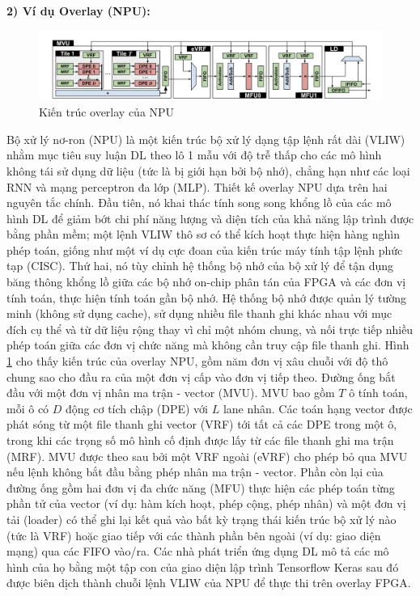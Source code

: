 \documentclass[a4paper]{article}
\begin{document}
\textbf{2) Ví dụ Overlay (NPU):}

\begin{figure} [!h]
    \centering
    \includegraphics[width=0.75\linewidth]{assets/fpga_6.png}
    \caption{Kiến trúc overlay của NPU}
    \label{fig:fpga_6}
\end{figure}

Bộ xử lý nơ-ron (NPU) là một kiến trúc bộ xử lý dạng tập lệnh rất dài (VLIW) nhằm mục tiêu suy luận DL theo lô 1 mẫu với độ trễ thấp cho các mô hình không tái sử dụng dữ liệu (tức là bị giới hạn bởi bộ nhớ), chẳng hạn như các loại RNN và mạng perceptron đa lớp (MLP). Thiết kế overlay NPU dựa trên hai nguyên tắc chính. Đầu tiên, nó khai thác tính song song khổng lồ của các mô hình DL để giảm bớt chi phí năng lượng và diện tích của khả năng lập trình được bằng phần mềm; một lệnh VLIW thô sơ có thể kích hoạt thực hiện hàng nghìn phép toán, giống như một ví dụ cực đoan của kiến trúc máy tính tập lệnh phức tạp (CISC). Thứ hai, nó tùy chỉnh hệ thống bộ nhớ của bộ xử lý để tận dụng băng thông khổng lồ giữa các bộ nhớ on-chip phân tán của FPGA và các đơn vị tính toán, thực hiện tính toán gần bộ nhớ. Hệ thống bộ nhớ được quản lý tường minh (không sử dụng cache), sử dụng nhiều file thanh ghi khác nhau với mục đích cụ thể và từ dữ liệu rộng thay vì chỉ một nhóm chung, và nối trực tiếp nhiều phép toán giữa các đơn vị chức năng mà không cần truy cập file thanh ghi. Hình \ref{fig:fpga_6} cho thấy kiến trúc của overlay NPU, gồm năm đơn vị xâu chuỗi với độ thô chung sao cho đầu ra của một đơn vị cấp vào đơn vị tiếp theo. Đường ống bắt đầu với một đơn vị nhân ma trận - vector (MVU). MVU bao gồm $T$ ô tính toán, mỗi ô có $D$ động cơ tích chập (DPE) với $L$ lane nhân. Các toán hạng vector được phát sóng từ một file thanh ghi vector (VRF) tới tất cả các DPE trong một ô, trong khi các trọng số mô hình cố định được lấy từ các file thanh ghi ma trận (MRF). MVU được theo sau bởi một VRF ngoài (eVRF) cho phép bỏ qua MVU nếu lệnh không bắt đầu bằng phép nhân ma trận - vector. Phần còn lại của đường ống gồm hai đơn vị đa chức năng (MFU) thực hiện các phép toán từng phần tử của vector (ví dụ: hàm kích hoạt, phép cộng, phép nhân) và một đơn vị tải (loader) có thể ghi lại kết quả vào bất kỳ trạng thái kiến trúc bộ xử lý nào (tức là VRF) hoặc giao tiếp với các thành phần bên ngoài (ví dụ: giao diện mạng) qua các FIFO vào/ra. Các nhà phát triển ứng dụng DL mô tả các mô hình của họ bằng một tập con của giao diện lập trình Tensorflow Keras sau đó được biên dịch thành chuỗi lệnh VLIW của NPU để thực thi trên overlay FPGA.
\end{document}

